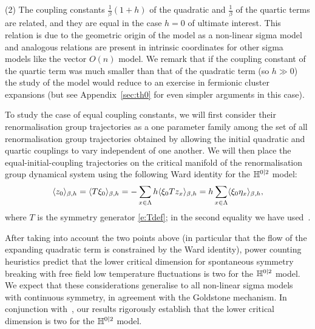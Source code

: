 \documentclass[11pt]{amsart}
\numberwithin{equation}{section}
\numberwithin{theorem}{section}
\newcommand{\1}{{\bf 1}}
\begin{document}
(2) The coupling constants $\frac{1}{\beta}(1+h)$ of the
quadratic and $\frac{1}{\beta}$ of the quartic terms are
related, and they are equal in the case $h=0$ of ultimate
interest. This relation is due to the geometric origin of the
model as a non-linear sigma model and analogous relations are present
in intrinsic coordinates for other sigma models like the vector $O(n)$
model. We remark that if the coupling constant of the quartic
term was much smaller than that of the quadratic term (so $h\gg 0$)
the study of the model would reduce to an exercise in fermionic
cluster expansions (but see Appendix~\ref{sec:th0} for even simpler
arguments in this case).

To study the case of equal coupling constants,  we will
first consider their renormalisation group trajectories as a one parameter family among the set  of all renormalisation group trajectories 
obtained by allowing the initial quadratic and quartic couplings to vary
independent of one another.  We will then place the  equal-initial-coupling trajectories
on the critical manifold of the renormalisation group dynamical system using
the following Ward identity for the $\mathbb{H}^{0|2}$ model:
\begin{equation} \label{e:ward}
  \langle z_0 \rangle_{\beta,h} = \langle T\xi_0 \rangle_{\beta,h} 
  = -\sum_{x\in\Lambda} h \langle \xi_0 Tz_x \rangle_{\beta,h}
  = h \sum_{x\in\Lambda} \langle \xi_0 \eta_x \rangle_{\beta,h},
\end{equation}
where $T$ is the symmetry generator \eqref{e:Tdef}; in the second
equality we have used~\cite[Lemma~2.3]{MR4218682}.


After taking into account the two points above (in particular
that the flow of the expanding quadratic term is constrained by the
Ward identity), power counting heuristics predict that the lower
critical dimension for spontaneous symmetry breaking with free field
low temperature fluctuations is two for the $\mathbb{H}^{0|2}$ model. 
We expect that these considerations generalise to all non-linear
sigma models with continuous symmetry, in agreement with the
Goldstone mechanism.  In conjunction with~\cite{MR4218682}, our
results rigorously establish that the lower critical dimension is two
for the $\mathbb{H}^{0|2}$ model.
\end{document}
